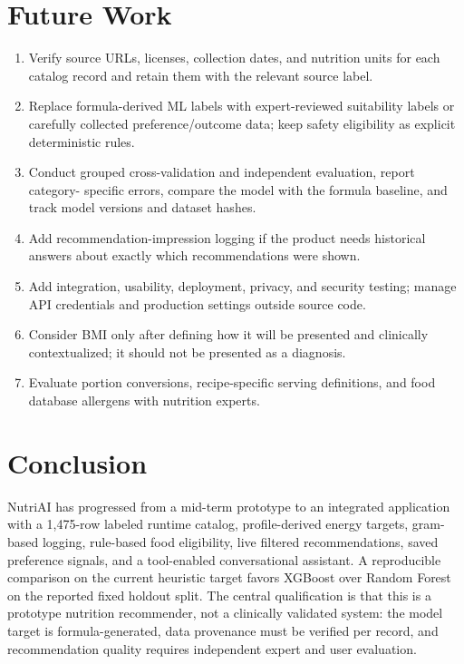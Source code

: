 \documentclass[12pt,a4paper]{report}
\begin{document}
\section{Future Work}
\begin{enumerate}
  \item Verify source URLs, licenses, collection dates, and nutrition units for each
        catalog record and retain them with the relevant source label.
  \item Replace formula-derived ML labels with expert-reviewed suitability labels or
        carefully collected preference/outcome data; keep safety eligibility as explicit
        deterministic rules.
  \item Conduct grouped cross-validation and independent evaluation, report category-
        specific errors, compare the model with the formula baseline, and track model
        versions and dataset hashes.
  \item Add recommendation-impression logging if the product needs historical answers
        about exactly which recommendations were shown.
  \item Add integration, usability, deployment, privacy, and security testing; manage API
        credentials and production settings outside source code.
  \item Consider BMI only after defining how it will be presented and clinically
        contextualized; it should not be presented as a diagnosis.
  \item Evaluate portion conversions, recipe-specific serving definitions, and food
        database allergens with nutrition experts.
\end{enumerate}

\section{Conclusion}
NutriAI has progressed from a mid-term prototype to an integrated application with a
1,475-row labeled runtime catalog, profile-derived energy targets, gram-based logging,
rule-based food eligibility, live filtered recommendations, saved preference signals,
and a tool-enabled conversational assistant. A reproducible comparison on the current
heuristic target favors XGBoost over Random Forest on the reported fixed holdout split.
The central qualification is that this is a prototype nutrition recommender, not a
clinically validated system: the model target is formula-generated, data provenance must
be verified per record, and recommendation quality requires independent expert and user
evaluation.
\end{document}
